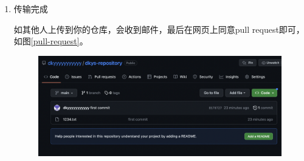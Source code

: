 \begin{enumerate}
    \item 传输完成

          如其他人上传到你的仓库，会收到邮件，最后在网页上同意pull request即可，如图\ref{pull-request}。
          \begin{figure}[ht]
              \begin{minipage}[c]{0.9\textwidth}
                  \centering
                  \includegraphics[width=13cm]{image/git/github-upload.png}
              \end{minipage}


\end{figure}
\end{enumerate}
